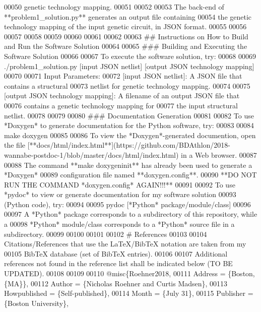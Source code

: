 \begin{DoxyCode}
00050    genetic technology mapping.
00051 
00052 
00053 The back-end of **problem1\_solution.py** generates an output file containing
00054    the genetic technology mapping of the input genetic circuit, in JSON format.
00055 
00056 
00057 
00058 
00059 
00060 
00061 
00062 
00063 ##  Instructions on How to Build and Run the Software Solution
00064 
00065 ###    Building and Executing the Software Solution
00066 
00067 To execute the software solution, try:
00068 
00069    ./problem1\_solution.py [input JSON netlist] [output JSON technology mapping]
00070 
00071 Input Parameters:
00072 [input JSON netlist]:                          A JSON file that contains a structural
00073                                                                        netlist for genetic technology
       mapping.
00074 
00075 [output JSON technology mapping]:  A filename of an output JSON file that
00076                                                                        contains a genetic technology
       mapping for
00077                                                                        the input structural netlist.
00078 
00079 
00080 ###    Documentation Generation
00081 
00082 To use *Doxygen* to generate documentation for the Python software, try:
00083 
00084    make doxygen
00085 
00086 To view the *Doxygen*-generated documention, open the file
       [**docs/html/index.html**](https://github.com/BDAthlon/2018-wannabe-postdoc-1/blob/master/docs/html/index.html) in a Web browser.
00087 
00088 The command **make doxygeninit** has already been used to generate a *Doxygen*
00089    configuration file named **doxygen.config**.
00090    **DO NOT RUN THE COMMAND *doxygen.config* AGAIN!!!**
00091 
00092 To use *pydoc* to view or generate documentation for my software solution
00093    (Python code), try:
00094 
00095    pydoc [*Python* package/module/class]
00096 
00097 A *Python* package corresponds to a subdirectory of this repository, while a
00098    *Python* module/class corresponds to a *Python* source file in a subdirectory.
00099 
00100 
00101 
00102 #  References
00103 
00104 Citations/References that use the LaTeX/BibTeX notation are taken from my
00105    BibTeX database (set of BibTeX entries).
00106 
00107 Additional references not found in the reference list shall be indicated below (TO BE UPDATED).
00108 
00109 
00110    @misc\{Roehner2018,
00111        Address = \{Boston, \{MA\}\},
00112        Author = \{Nicholas Roehner and Curtis Madsen\},
00113        Howpublished = \{Self-published\},
00114        Month = \{July 31\},
00115        Publisher = \{Boston University\},

\end{DoxyCode}
